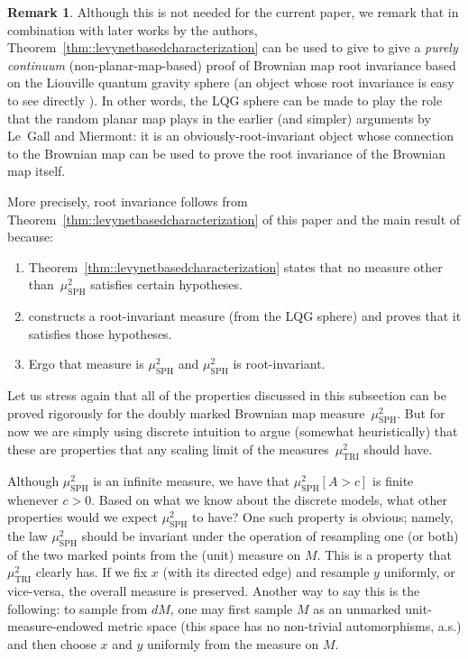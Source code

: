\documentclass[10pt]{amsart}
\theoremstyle{plain}
\numberwithin{theorem}{section}
\theoremstyle{definition}
\newtheorem{remark}[theorem]{Remark}
\newcommand{\mustwo}{\mu_{\mathrm{SPH}}^2}
\begin{document}
\begin{remark}
\label{rem::alternaterootinvarianceproof}
Although this is not needed for the current paper, we remark that in combination with later works by the authors, Theorem~\ref{thm::levynetbasedcharacterization} can be used to give to give a \emph{purely continuum} (non-planar-map-based) proof of Brownian map root invariance based on the Liouville quantum gravity sphere (an object whose root invariance is easy to see directly \cite{matingtrees}).
In other words, the LQG sphere can be made to play the role that the random planar map plays in the earlier (and simpler) arguments by Le~Gall and Miermont: it is an obviously-root-invariant object whose connection to the Brownian map can be used to prove the root invariance of the Brownian map itself.

More precisely, root invariance follows from Theorem~\ref{thm::levynetbasedcharacterization} of this paper and the main result of \cite{qle_continuity} because:
\begin{enumerate}
\item Theorem~\ref{thm::levynetbasedcharacterization} states that no measure other than~$\mustwo$ satisfies certain hypotheses.
\item \cite{qle_continuity} constructs a root-invariant measure (from the LQG sphere) and proves that it satisfies those hypotheses.
\item Ergo that measure is $\mustwo$ and $\mustwo$ is root-invariant.
\end{enumerate}

\end{remark}

Let us stress again that all of the properties discussed in this subsection can be proved rigorously for the doubly marked Brownian map measure~$\mustwo$. But for now we are simply using discrete intuition to argue (somewhat heuristically) that these are properties that any scaling limit of the measures~$\mu^2_{\mathrm{TRI}}$ should have.

Although $\mustwo$ is an infinite measure, we have that $\mustwo[ A > c ]$ is finite whenever $c > 0$. Based on what we know about the discrete models, what other properties would we expect $\mustwo$ to have? One such property is obvious; namely, the law $\mustwo$ should be invariant under the operation of resampling one (or both) of the two marked points from the (unit) measure on $M$. This is a property that $\mu^2_{\mathrm{TRI}}$ clearly has. If we fix $x$ (with its directed edge) and resample $y$ uniformly, or vice-versa, the overall measure is preserved. Another way to say this is the following: to sample from $dM$, one may first sample $M$ as an unmarked unit-measure-endowed metric space (this space has no non-trivial automorphisms, a.s.) and then choose $x$ and $y$ uniformly from the measure on $M$.
\end{document}
